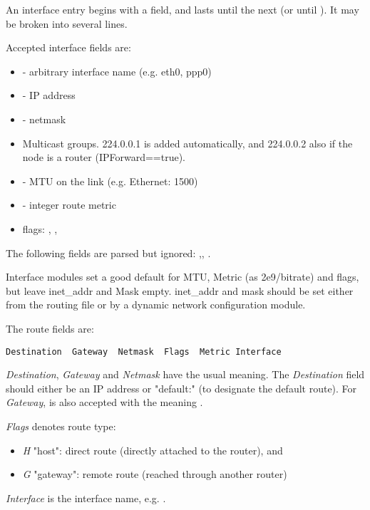 An interface entry begins with a  field, and lasts until
the next  (or until ). It may
be broken into several lines.

Accepted interface fields are:

\begin{itemize}
  \item {} - arbitrary interface name (e.g. eth0, ppp0)
  \item {} - IP address
  \item {} - netmask
  \item {} Multicast groups. 224.0.0.1 is added automatically,
     and 224.0.0.2 also if the node is a router (IPForward==true).
  \item {} - MTU on the link (e.g. Ethernet: 1500)
  \item {} - integer route metric
  \item flags: , , 
\end{itemize}

The following fields are parsed but ignored: ,,
.

Interface modules set a good default for MTU, Metric (as 2e9/bitrate) and
flags, but leave inet\_addr and Mask empty. inet\_addr and mask should
be set either from the routing file or by a dynamic network configuration
module.

The route fields are:

\begin{verbatim}
Destination  Gateway  Netmask  Flags  Metric Interface
\end{verbatim}

\textit{Destination}, \textit{Gateway} and \textit{Netmask} have the usual meaning.
The \textit{Destination} field should either be an IP address or "default:"
(to designate the default route). For \textit{Gateway}, \ttt{*} is also
accepted with the meaning .

\textit{Flags} denotes route type:

\begin{itemize}
  \item \textit{H} "host": direct route (directly attached to the router), and
  \item \textit{G} "gateway": remote route (reached through another router)
\end{itemize}

\textit{Interface} is the interface name, e.g. .



